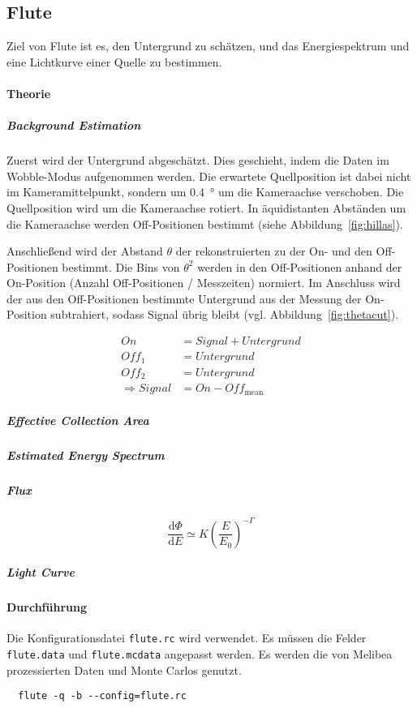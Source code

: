 \subsection{Flute}%
\label{sub:flute}

Ziel von Flute ist es,
den Untergrund zu schätzen,
und das Energiespektrum und
eine Lichtkurve einer Quelle zu bestimmen.

\paragraph{Theorie}%

\subparagraph{Background Estimation}
Zuerst wird der Untergrund abgeschätzt.
Dies geschieht, indem die Daten im Wobble-Modus aufgenommen werden.
Die erwartete Quellposition ist dabei nicht im
Kameramittelpunkt,
sondern um
\SI{0.4}{\degree} um die Kameraachse
verschoben.
Die Quellposition wird um die Kameraachse rotiert.
In äquidistanten Abständen um die Kameraachse werden Off-Positionen bestimmt
(siehe Abbildung~\ref{fig:hillas}).

Anschließend wird der Abstand $\theta$ der rekonstruierten
zu der On- und den Off-Positionen bestimmt.
Die Bins von $\theta^2$ werden in den Off-Positionen
anhand der On-Position (Anzahl Off-Positionen / Messzeiten) normiert.
Im Anschluss wird der aus den Off-Positionen bestimmte Untergrund
aus der Messung der On-Position subtrahiert, sodass Signal übrig bleibt
(vgl. Abbildung~\ref{fig:thetacut}).


\begin{align*}
    On &= Signal + Untergrund \\
    Off_{1} &= Untergrund \\
    Off_{2} &= Untergrund \\
    \Rightarrow Signal &= On - Off_{\text{mean}}
\end{align*}

\subparagraph{Effective Collection Area}
\subparagraph{Estimated Energy Spectrum}
\subparagraph{Flux}

\begin{equation}
\frac{\text{d} \Phi}{\text{d}E} \simeq K {\left( \frac{E}{E_0} \right)}^{- \Gamma}
\end{equation}

\subparagraph{Light Curve}

\paragraph{Durchführung}%

Die Konfigurationsdatei \texttt{flute.rc} wird verwendet.
Es müssen die Felder \texttt{flute.data} und \texttt{flute.mcdata} angepasst werden.
Es werden die von Melibea prozessierten Daten und Monte Carlos genutzt.


\begin{lstlisting}
  flute -q -b --config=flute.rc
\end{lstlisting}
